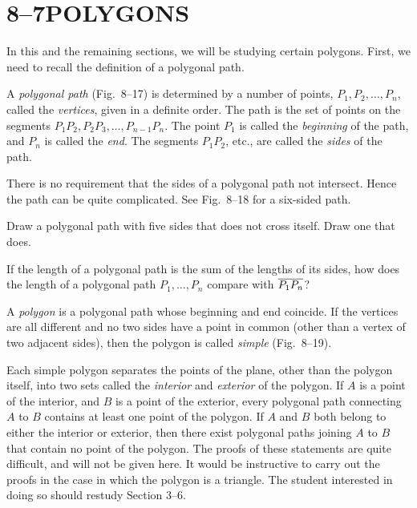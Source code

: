 \documentclass[11pt]{book}
\begin{document}
\section*{8--7\quad POLYGONS}

In this and the remaining sections, we will be studying certain polygons.
First, we need to recall the definition of a polygonal path.

A \emph{polygonal path} (Fig.~8--17) is determined by a number of points,
$P_1, P_2, \ldots, P_n$, called the \emph{vertices}, given in a definite
order. The path is the set of points on the segments
$P_1P_2, P_2P_3, \ldots, P_{n-1}P_n$. The point $P_1$ is called the
\emph{beginning} of the path, and $P_n$ is called the \emph{end}. The segments
$P_1P_2$, etc., are called the \emph{sides} of the path.

\FIGVIIISEVENTEENEIGHTEEN

\begin{remark}
There is no requirement that the sides of a polygonal path not intersect.
Hence the path can be quite complicated. See Fig.~8--18 for a six-sided path.
\end{remark}

\begin{exercisecols}
\begin{exlist}
\item Draw a polygonal path with five sides that does not cross itself. Draw
  one that does.
\item If the length of a polygonal path is the sum of the lengths of its
  sides, how does the length of a polygonal path $P_1, \ldots, P_n$ compare
  with $\overline{P_1P_n}$?
\end{exlist}
\end{exercisecols}

\begin{definition}
A \emph{polygon} is a polygonal path whose beginning and end coincide. If the
vertices are all different and no two sides have a point in common (other than
a vertex of two adjacent sides), then the polygon is called \emph{simple}
(Fig.~8--19).
\end{definition}

\FIGVIIININETEEN

Each simple polygon separates the points of the plane, other than the polygon
itself, into two sets called the \emph{interior} and \emph{exterior} of the
polygon. If $A$ is a point of the interior, and $B$ is a point of the
exterior, every polygonal path connecting $A$ to $B$ contains at least one
point of the polygon. If $A$ and $B$ both belong to either the interior or
exterior, then there exist polygonal paths joining $A$ to $B$ that contain no
point of the polygon. The proofs of these statements are quite difficult, and
will not be given here. It would be instructive to carry out the proofs in the
case in which the polygon is a triangle. The student interested in doing so
should restudy Section 3--6.
\end{document}
